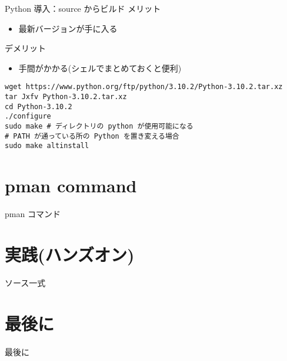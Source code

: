 \documentclass[compress,dvipdfmx,11pt]{beamer}
\begin{document}
\begin{frame}[label={sec:orgeeaaa14},fragile]{Python 導入：source からビルド}
 メリット
\begin{itemize}
\item 最新バージョンが手に入る
\end{itemize}
デメリット
\begin{itemize}
\item 手間がかかる(シェルでまとめておくと便利)
\end{itemize}
\begin{verbatim}
wget https://www.python.org/ftp/python/3.10.2/Python-3.10.2.tar.xz
tar Jxfv Python-3.10.2.tar.xz
cd Python-3.10.2
./configure
sudo make # ディレクトリの python が使用可能になる
# PATH が通っている所の Python を置き変える場合
sudo make altinstall

\end{verbatim}
\end{frame}



\section{pman command}
\label{sec:org4d68dd9}
\begin{frame}[label={sec:orgca1f2f0}]{pman コマンド}
\end{frame}

\section{実践(ハンズオン)}
\label{sec:orgc32f493}
\begin{frame}[label={sec:org91c5849}]{ソース一式}
\end{frame}

\section{最後に}
\label{sec:org960491f}
\begin{frame}[label={sec:orgeb977ef}]{最後に}
\end{frame}
\end{document}
